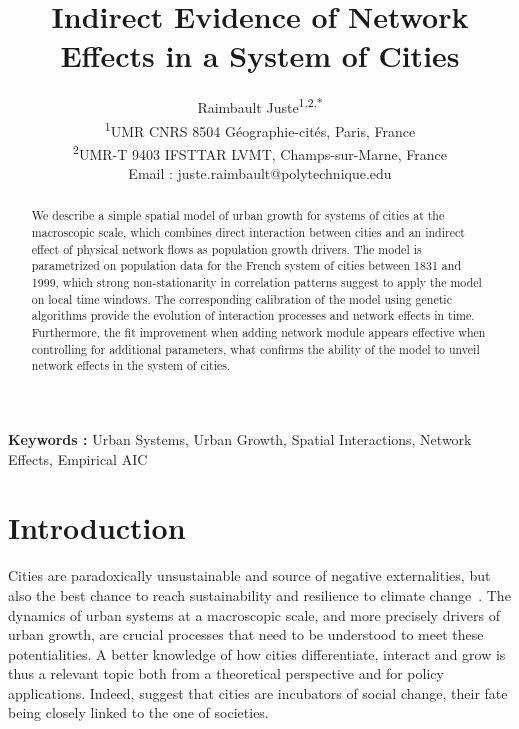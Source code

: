\documentclass{article}
\title{Indirect Evidence of Network Effects in a System of Cities}
\date{}
\author{Raimbault Juste\textsuperscript{1,2,*}\\
\textsuperscript{1}UMR CNRS 8504 G{\'e}ographie-cit{\'e}s, Paris, France\\
\textsuperscript{2}UMR-T 9403 IFSTTAR LVMT, Champs-sur-Marne, France\\
Email : juste.raimbault@polytechnique.edu}
\begin{document}
\maketitle




\begin{abstract}
We describe a simple spatial model of urban growth for systems of cities at the macroscopic scale, which combines direct interaction between cities and an indirect effect of physical network flows as population growth drivers. The model is parametrized on population data for the French system of cities between 1831 and 1999, which strong non-stationarity in correlation patterns suggest to apply the model on local time windows. The corresponding calibration of the model using genetic algorithms provide the evolution of interaction processes and network effects in time. Furthermore, the fit improvement when adding network module appears effective when controlling for additional parameters, what confirms the ability of the model to unveil network effects in the system of cities.
\end{abstract}

\textbf{Keywords : } Urban Systems, Urban Growth, Spatial Interactions, Network Effects, Empirical AIC

\maketitle







\section*{Introduction}


Cities are paradoxically unsustainable and source of negative externalities, but also the best chance to reach sustainability and resilience to climate change~\citep{glaeser2011triumph}. The dynamics of urban systems at a macroscopic scale, and more precisely drivers of urban growth, are crucial processes that need to be understood to meet these potentialities. A better knowledge of how cities differentiate, interact and grow is thus a relevant topic both from a theoretical perspective and for policy applications. Indeed, \cite{pumain2009innovation} suggest that cities are incubators of social change, their fate being closely linked to the one of societies. 
\end{document}

